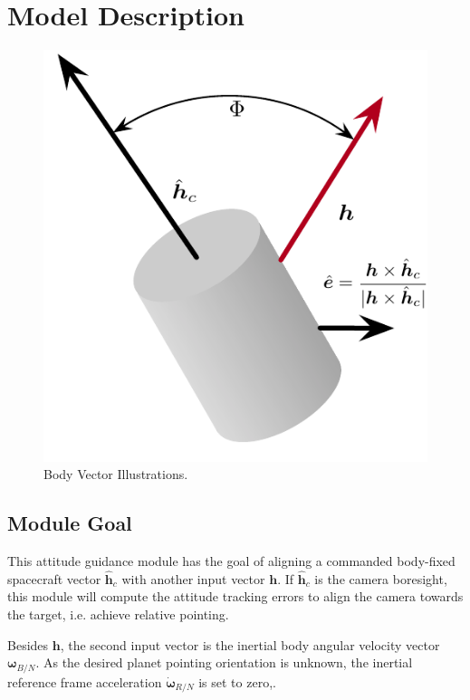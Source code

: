
\section{Model Description}

\begin{figure}[t]
	\centerline{
		\includegraphics{Figures/Heading}
	}
	\caption{Body Vector Illustrations.}
	\label{fig:Fig1}
\end{figure}

\subsection{Module Goal}
This attitude guidance module has the goal of aligning a commanded body-fixed spacecraft vector $\hat{\bm h}_{c}$ with another input vector $\bm h$.  If $\hat{\bm h}_{c}$ is the camera boresight, this module will compute the attitude tracking errors to align the camera towards the target, i.e. achieve relative pointing. 

Besides $\bm h$, the second input vector is the inertial body angular velocity vector $\bm\omega_{B/N}$. As the desired planet pointing orientation is unknown, the inertial reference frame acceleration $\dot{\bm\omega}_{R/N}$ is set to zero,.  

